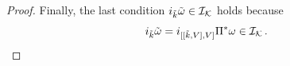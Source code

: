 \documentclass[10pt,a4paper]{amsart}
\def\cI{\mathcal{I}}
\def\cK{\mathcal{K}}
\begin{document}
\begin{proof}
Finally, the last condition  $i_{\Tilde{k}}\Tilde{\omega} \in \cI_{\cK}$ holds because
\begin{equation}
    i_{\Tilde{k}}\Tilde{\omega} = i_{[[\Tilde{k},V],V]}\Pi^*\omega \in \cI_{\cK}\,.
\end{equation}
\end{proof}
\end{document}
